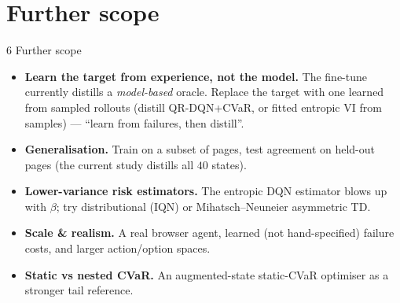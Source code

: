 \documentclass[aspectratio=169,11pt]{beamer}
\begin{document}
\section{Further scope}
\begin{frame}{6 \quad Further scope}
  \begin{itemize}
    \item \textbf{Learn the target from experience, not the model.} The fine-tune currently
          distills a \emph{model-based} oracle. Replace the target with one learned from
          sampled rollouts (distill QR-DQN+CVaR, or fitted entropic VI from samples) ---
          ``learn from failures, then distill''.
    \item \textbf{Generalisation.} Train on a subset of pages, test agreement on held-out
          pages (the current study distills all $40$ states).
    \item \textbf{Lower-variance risk estimators.} The entropic DQN estimator blows up with
          $\beta$; try distributional (IQN) or Mihatsch--Neuneier asymmetric TD.
    \item \textbf{Scale \& realism.} A real browser agent, learned (not hand-specified)
          failure costs, and larger action/option spaces.
    \item \textbf{Static vs nested CVaR.} An augmented-state static-CVaR optimiser as a
          stronger tail reference.
  \end{itemize}
\end{frame}

\end{document}
